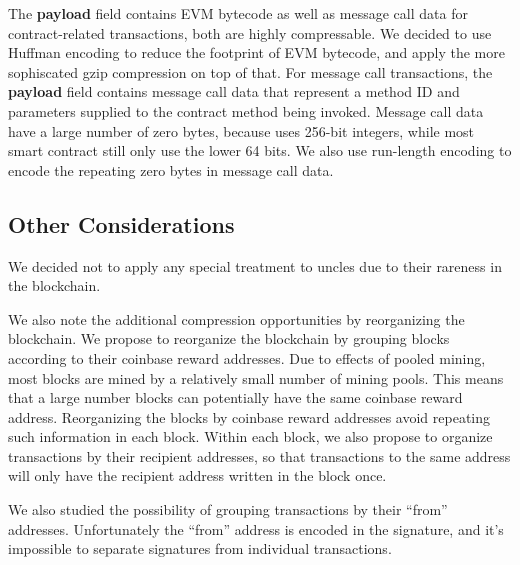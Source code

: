 The \textbf{payload} field contains EVM bytecode as well as message call data for contract-related transactions,
both are highly compressable. We decided to use Huffman encoding to reduce the footprint of EVM bytecode,
and apply the more sophiscated gzip compression on top of that.
For message call transactions, the \textbf{payload} field contains message call data that represent a method ID and
parameters supplied to the contract method being invoked.
Message call data have a large number of zero bytes, because \eth{} uses 256-bit integers,
while most smart contract still only use the lower 64 bits.
We also use run-length encoding to encode the repeating zero bytes in message call data.

\subsection{Other Considerations}

We decided not to apply any special treatment to uncles due to their rareness in the blockchain.

We also note the additional compression opportunities by reorganizing the blockchain.
We propose to reorganize the blockchain by grouping blocks according to their coinbase reward addresses.
Due to effects of pooled mining, most blocks are mined by a relatively small number of mining pools.
This means that a large number blocks can potentially have the same coinbase reward address.
Reorganizing the blocks by coinbase reward addresses avoid repeating such information in each block.
Within each block, we also propose to organize transactions by their recipient addresses, so that
transactions to the same address will only have the recipient address written in the block once.

We also studied the possibility of grouping transactions by their ``from'' addresses.
Unfortunately the ``from'' address is encoded in the signature, and it's impossible to
separate signatures from individual transactions.
